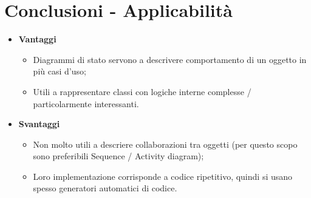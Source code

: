 \documentclass{article}
\begin{document}
  \section{Conclusioni - Applicabilità}
    \begin{itemize}
        \item \textbf{Vantaggi}
          \begin{itemize}
              \item Diagrammi di stato servono a descrivere comportamento di un oggetto in più casi d'uso;
              \item Utili a rappresentare classi con logiche interne complesse / particolarmente interessanti.
          \end{itemize}
        \item \textbf{Svantaggi}
          \begin{itemize}
              \item Non molto utili a descriere collaborazioni tra oggetti (per questo scopo sono preferibili Sequence / Activity diagram);
              \item Loro implementazione corrisponde a codice ripetitivo, quindi si usano spesso generatori automatici di codice.
          \end{itemize}
    \end{itemize}
\end{document}
